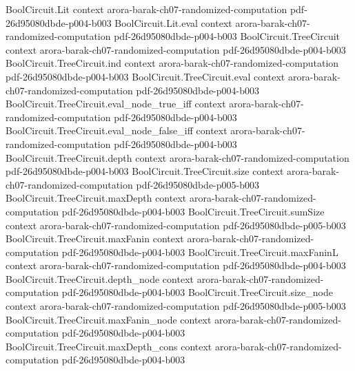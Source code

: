 \begin{theorem}
\label{Randomized.P_subset_BPP_PTM}
\leanok
{}
\proofstep
  {BoolCircuit.Lit}
  {context}
  {arora-barak-ch07-randomized-computation}
  {pdf-26d95080dbde-p004-b003}
\proofstep
  {BoolCircuit.Lit.eval}
  {context}
  {arora-barak-ch07-randomized-computation}
  {pdf-26d95080dbde-p004-b003}
\proofstep
  {BoolCircuit.TreeCircuit}
  {context}
  {arora-barak-ch07-randomized-computation}
  {pdf-26d95080dbde-p004-b003}
\proofstep
  {BoolCircuit.TreeCircuit.ind}
  {context}
  {arora-barak-ch07-randomized-computation}
  {pdf-26d95080dbde-p004-b003}
\proofstep
  {BoolCircuit.TreeCircuit.eval}
  {context}
  {arora-barak-ch07-randomized-computation}
  {pdf-26d95080dbde-p004-b003}
\proofstep
  {BoolCircuit.TreeCircuit.eval_node_true_iff}
  {context}
  {arora-barak-ch07-randomized-computation}
  {pdf-26d95080dbde-p004-b003}
\proofstep
  {BoolCircuit.TreeCircuit.eval_node_false_iff}
  {context}
  {arora-barak-ch07-randomized-computation}
  {pdf-26d95080dbde-p004-b003}
\proofstep
  {BoolCircuit.TreeCircuit.depth}
  {context}
  {arora-barak-ch07-randomized-computation}
  {pdf-26d95080dbde-p004-b003}
\proofstep
  {BoolCircuit.TreeCircuit.size}
  {context}
  {arora-barak-ch07-randomized-computation}
  {pdf-26d95080dbde-p005-b003}
\proofstep
  {BoolCircuit.TreeCircuit.maxDepth}
  {context}
  {arora-barak-ch07-randomized-computation}
  {pdf-26d95080dbde-p004-b003}
\proofstep
  {BoolCircuit.TreeCircuit.sumSize}
  {context}
  {arora-barak-ch07-randomized-computation}
  {pdf-26d95080dbde-p005-b003}
\proofstep
  {BoolCircuit.TreeCircuit.maxFanin}
  {context}
  {arora-barak-ch07-randomized-computation}
  {pdf-26d95080dbde-p004-b003}
\proofstep
  {BoolCircuit.TreeCircuit.maxFaninL}
  {context}
  {arora-barak-ch07-randomized-computation}
  {pdf-26d95080dbde-p004-b003}
\proofstep
  {BoolCircuit.TreeCircuit.depth_node}
  {context}
  {arora-barak-ch07-randomized-computation}
  {pdf-26d95080dbde-p004-b003}
\proofstep
  {BoolCircuit.TreeCircuit.size_node}
  {context}
  {arora-barak-ch07-randomized-computation}
  {pdf-26d95080dbde-p005-b003}
\proofstep
  {BoolCircuit.TreeCircuit.maxFanin_node}
  {context}
  {arora-barak-ch07-randomized-computation}
  {pdf-26d95080dbde-p004-b003}
\proofstep
  {BoolCircuit.TreeCircuit.maxDepth_cons}
  {context}
  {arora-barak-ch07-randomized-computation}
  {pdf-26d95080dbde-p004-b003}

\end{theorem}
